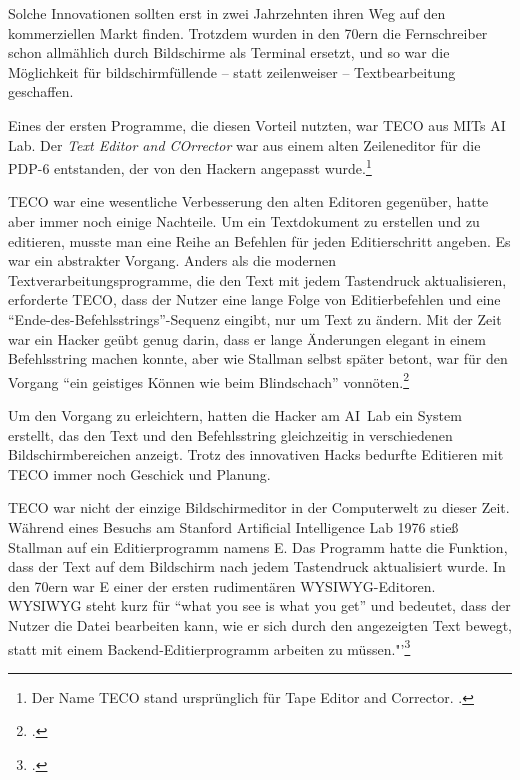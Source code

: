 Solche Innovationen sollten erst in zwei Jahrzehnten ihren Weg auf den kommerziellen Markt finden. Trotzdem wurden in den 70ern die Fernschreiber schon allmählich durch Bildschirme als Terminal ersetzt, und so war die Möglichkeit für bildschirmfüllende – statt zeilenweiser – Textbearbeitung geschaffen.

Eines der ersten Programme, die diesen Vorteil nutzten, war TECO aus MITs AI Lab. Der \textit{Text Editor and COrrector} war aus einem alten Zeileneditor für die PDP-6 entstanden, der von den Hackern angepasst wurde.\footnote{Der Name TECO stand ursprünglich für Tape Editor and Corrector. \cite[Vgl.][Glossary: "`TECO"']{jargonf}.}

TECO war eine wesentliche Verbesserung den alten Editoren gegenüber, hatte aber immer noch einige Nachteile. Um ein Textdokument zu erstellen und zu editieren, musste man eine Reihe an Befehlen für jeden Editierschritt angeben. Es war ein abstrakter Vorgang. Anders als die modernen Textverarbeitungsprogramme, die den Text mit jedem Tastendruck aktualisieren, erforderte TECO, dass der Nutzer eine lange Folge von Editierbefehlen und eine "`Ende-des-Befehlsstrings"'-Sequenz eingibt, nur um Text zu ändern. Mit der Zeit war ein Hacker geübt genug darin, dass er lange Änderungen elegant in einem Befehlsstring machen konnte, aber wie Stallman selbst später betont, war für den Vorgang "`ein geistiges Können wie beim Blindschach"' vonnöten.\footcite[Vgl.][ich zitiere aus der aktualisierten HTML-Version]{emacspaper}

Um den Vorgang zu erleichtern, hatten die Hacker am AI~Lab ein System erstellt, das den Text und den Befehlsstring gleichzeitig in verschiedenen Bildschirmbereichen anzeigt. Trotz des innovativen Hacks bedurfte Editieren mit TECO immer noch Geschick und Planung.

TECO war nicht der einzige Bildschirmeditor in der Computerwelt zu dieser Zeit. Während eines Besuchs am Stanford Artificial Intelligence Lab 1976 stieß Stallman auf ein Editierprogramm namens E. Das Programm hatte die Funktion, dass der Text auf dem Bildschirm nach jedem Tastendruck aktualisiert wurde. In den 70ern war E einer der ersten rudimentären WYSIWYG-Editoren. WYSIWYG steht kurz für "`what you see is what you get"' und bedeutet, dass der Nutzer die Datei bearbeiten kann, wie er sich durch den angezeigten Text bewegt, statt mit einem Backend-Editierprogramm arbeiten zu müssen."'\footcite[Vgl.][]{rmsetfse}

